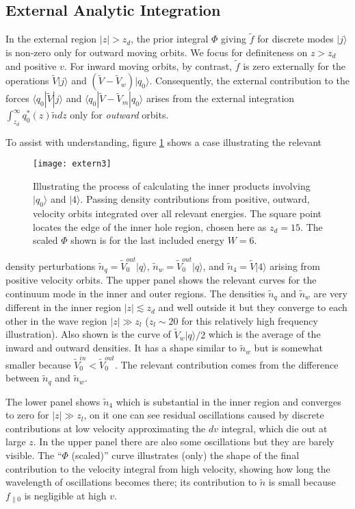 \documentclass[12pt]{article}
\def\ket#1{|#1\rangle}
\def\bra#1{\langle#1}
\begin{document}
\subsection{External Analytic Integration}

In the external region $|z|>z_d$, the prior integral $\Phi$ giving
$\tilde f$ for discrete modes $\ket{j}$ is non-zero only for outward
moving orbits. We focus for definiteness on $z>z_d$ and positive $v$.
For inward moving orbits, by contrast, $\tilde f$ is zero externally
for the operations $\tilde V\ket{j}$ and
$(\tilde V -\tilde V_w)\ket{q_0}$. Consequently, the external
contribution to the forces $\bra{q_0}|\tilde V \ket{j}$ and
$\bra{q_0}|\tilde V -\tilde V_m\ket{q_0}$ arises from the external
integration $\int_{z_d}^\infty q_0^*(z) \tilde n dz$ only for \emph{outward} orbits.

To assist with understanding, figure \ref{externfig2} shows a case
illustrating the relevant
\begin{figure}[ht]
  \texttt{[image: extern3]}
  \caption{Illustrating the process of calculating the inner products
    involving $\ket{q_0}$ and $\ket{4}$. Passing density contributions
    from positive, outward, velocity orbits integrated over all
    relevant energies. The square point locates the edge of the inner
    hole region, chosen here as $z_d=15$. The scaled $\Phi$ shown is
    for the last included energy $W=6$.\label{externfig2}}
\end{figure}
density perturbations $\tilde n_q=\tilde V_0^{out}\ket{q}$,
$\tilde n_w=\tilde V_0^{out}\ket{q}$, and $\tilde n_4=\tilde V\ket{4}$
arising from positive velocity orbits. The upper panel shows the
relevant curves for the continuum mode in the inner and outer regions.
The densities $\tilde n_q$ and $\tilde n_w$ are very different in the
inner region $|z|\lesssim z_d$ and well outside it but they converge to each
other in the wave region $|z|\gg z_l$ ($z_l\sim 20$ for this
relatively high frequency illustration). Also shown is the curve of
$\tilde V_w\ket{q}/2$ which is the average of the inward and
outward densities. It has a shape similar to $\tilde n_w$ but is
somewhat smaller because $\tilde V_0^{in}< \tilde V_0^{out}$. The
relevant contribution comes from the difference between $\tilde n_q$
and $\tilde n_w$. 

The lower panel shows $\tilde n_4$ which is substantial in the inner
region and converges to zero for $|z|\gg z_l$, on it one can see
residual oscillations caused by discrete contributions at low velocity
approximating the $dv$ integral, which die out at large $z$. In the
upper panel there are also some oscillations but they are barely
visible. The ``$\Phi$ (scaled)'' curve illustrates (only) the shape of
the final contribution to the velocity integral from high velocity,
showing how long the wavelength of oscillations becomes there; its
contribution to $\tilde n$ is small because $f_{\parallel0}$ is
negligible at high $v$.
\end{document}
